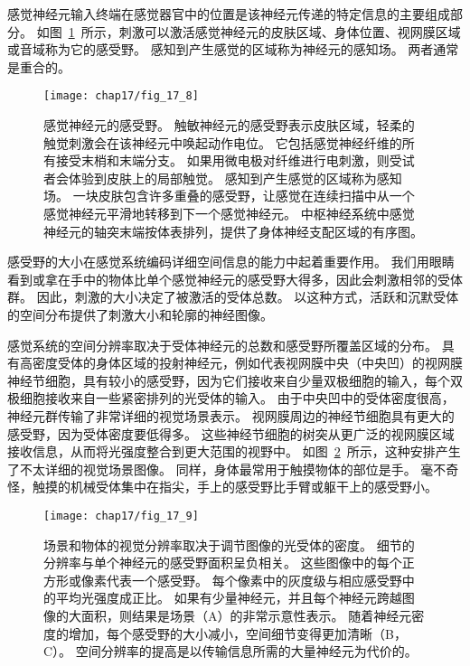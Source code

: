 感觉神经元输入终端在感觉器官中的位置是该神经元传递的特定信息的主要组成部分。 
如图~\ref{fig:17_8}~所示，刺激可以激活感觉神经元的皮肤区域、身体位置、视网膜区域或音域称为它的感受野。
感知到产生感觉的区域称为神经元的感知场。
两者通常是重合的。


\begin{figure}[htbp]
	\centering
	\texttt{[image: chap17/fig\_17\_8]}
	\caption{感觉神经元的感受野。
		触敏神经元的感受野表示皮肤区域，轻柔的触觉刺激会在该神经元中唤起动作电位。
		它包括感觉神经纤维的所有接受末梢和末端分支。
		如果用微电极对纤维进行电刺激，则受试者会体验到皮肤上的局部触觉。
		感知到产生感觉的区域称为感知场。
		一块皮肤包含许多重叠的感受野，让感觉在连续扫描中从一个感觉神经元平滑地转移到下一个感觉神经元。
		中枢神经系统中感觉神经元的轴突末端按体表排列，提供了身体神经支配区域的有序图。}
	\label{fig:17_8}
\end{figure}

感受野的大小在感觉系统编码详细空间信息的能力中起着重要作用。 
我们用眼睛看到或拿在手中的物体比单个感觉神经元的感受野大得多，因此会刺激相邻的受体群。 
因此，刺激的大小决定了被激活的受体总数。 
以这种方式，活跃和沉默受体的空间分布提供了刺激大小和轮廓的神经图像。


感觉系统的空间分辨率取决于受体神经元的总数和感受野所覆盖区域的分布。
具有高密度受体的身体区域的投射神经元，例如代表视网膜中央（中央凹）的视网膜神经节细胞，具有较小的感受野，因为它们接收来自少量双极细胞的输入，每个双极细胞接收来自一些紧密排列的光受体的输入。
由于中央凹中的受体密度很高，神经元群传输了非常详细的视觉场景表示。
视网膜周边的神经节细胞具有更大的感受野，因为受体密度要低得多。
这些神经节细胞的树突从更广泛的视网膜区域接收信息，从而将光强度整合到更大范围的视野中。
如图~\ref{fig:17_9}~所示，这种安排产生了不太详细的视觉场景图像。
同样，身体最常用于触摸物体的部位是手。
毫不奇怪，触摸的机械受体集中在指尖，手上的感受野比手臂或躯干上的感受野小。


\begin{figure}[htbp]
	\centering
	\texttt{[image: chap17/fig\_17\_9]}
	\caption{场景和物体的视觉分辨率取决于调节图像的光受体的密度。
		细节的分辨率与单个神经元的感受野面积呈负相关。
		这些图像中的每个正方形或像素代表一个感受野。
		每个像素中的灰度级与相应感受野中的平均光强度成正比。
		如果有少量神经元，并且每个神经元跨越图像的大面积，则结果是场景（A）的非常示意性表示。 
		随着神经元密度的增加，每个感受野的大小减小，空间细节变得更加清晰（B，C）。
		空间分辨率的提高是以传输信息所需的大量神经元为代价的。}
	\label{fig:17_9}
\end{figure}




